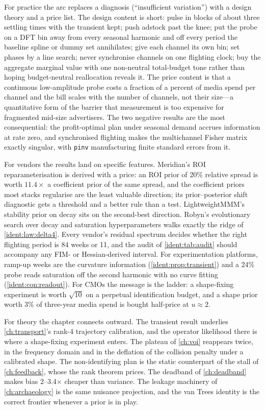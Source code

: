 For practice the arc replaces a diagnosis (``insufficient variation'') with a design theory and a price list. The design content is short: pulse in blocks of about three settling times with the transient kept; push adstock past the knee; put the probe on a DFT bin away from every seasonal harmonic and off every period the baseline spline or dummy set annihilates; give each channel its own bin; set phases by a line search; never synchronise channels on one flighting clock; buy the aggregate marginal value with one non-neutral total-budget tone rather than hoping budget-neutral reallocation reveals it. The price content is that a continuous low-amplitude probe costs a fraction of a percent of media spend per channel and the bill scales with the number of channels, not their size---a quantitative form of the barrier that measurement is too expensive for fragmented mid-size advertisers. The two negative results are the most consequential: the profit-optimal plan under seasonal demand accrues information at rate zero, and synchronised flighting makes the multichannel Fisher matrix exactly singular, with \texttt{pinv} manufacturing finite standard errors from it.

For vendors the results land on specific features. Meridian's ROI reparameterisation is derived with a price: an ROI prior of 20\% relative spread is worth $11.4\times$ a coefficient prior of the same spread, and the coefficient priors most stacks regularise are the least valuable direction; its prior--posterior shift diagnostic gets a threshold and a better rule than a test. LightweightMMM's stability prior on decay sits on the second-best direction. Robyn's evolutionary search over decay and saturation hyperparameters walks exactly the ridge of \cref{ident:law:delta4}. Every vendor's residual spectrum decides whether the right flighting period is 84 weeks or 11, and the audit of \cref{ident:tab:audit} should accompany any FIM- or Hessian-derived interval. For experimentation platforms, ramp-up weeks are the curvature information (\cref{ident:prop:transient}) and a 24\% probe reads saturation off the second harmonic with no curve fitting (\cref{ident:con:readout}). For CMOs the message is the ladder: a shape-fixing experiment is worth $\sqrt{10}$ on a perpetual identification budget, and a shape prior worth 3\% of three-year media spend is bought half-price at $u \approx 2$.

For theory the chapter connects outward. The transient result underlies \cref{ch:transport}'s rank-4 trajectory calibration, and the operator likelihood there is where a shape-fixing experiment enters. The plateau of \cref{ch:voi} reappears twice, in the frequency domain and in the deflation of the collision penalty under a calibrated shape. The non-identifying plan is the static counterpart of the stall of \cref{ch:feedback}, whose  the rank theorem prices. The deadband of \cref{ch:deadband} makes bias 2--3.4$\times$ cheaper than variance. The leakage machinery of \cref{ch:archaeology} is the same nuisance projection, and the van Trees identity is the correct frontier whenever a prior is in play.

